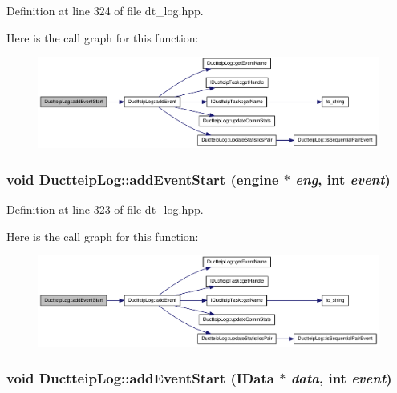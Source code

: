 Definition at line 324 of file dt\_\-log.hpp.

Here is the call graph for this function:\nopagebreak
\begin{figure}[H]
\begin{center}
\leavevmode
\includegraphics[width=371pt]{class_ductteip_log_aeb089df178933400cffbbf46a1352e69_cgraph}
\end{center}
\end{figure}
\hypertarget{class_ductteip_log_ab89eac3be95eb5663a8f752413f6b0d0}{
\subsubsection[{addEventStart}]{\setlength{\rightskip}{0pt plus 5cm}void DuctteipLog::addEventStart ({\bf engine} $\ast$ {\em eng}, \/  int {\em event})}}
\label{class_ductteip_log_ab89eac3be95eb5663a8f752413f6b0d0}


Definition at line 323 of file dt\_\-log.hpp.

Here is the call graph for this function:\nopagebreak
\begin{figure}[H]
\begin{center}
\leavevmode
\includegraphics[width=371pt]{class_ductteip_log_ab89eac3be95eb5663a8f752413f6b0d0_cgraph}
\end{center}
\end{figure}
\hypertarget{class_ductteip_log_a8dca88c37b6ae7b96a58ce6d04053fd9}{
\subsubsection[{addEventStart}]{\setlength{\rightskip}{0pt plus 5cm}void DuctteipLog::addEventStart ({\bf IData} $\ast$ {\em data}, \/  int {\em event})}}
\label{class_ductteip_log_a8dca88c37b6ae7b96a58ce6d04053fd9}


